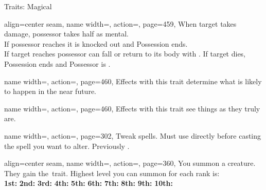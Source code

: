 \begin{PageFrontLandscape}
\begin{TablesHalf}{\frontTableHeight}
\begin{Table}{Traits: Magical}
\begin{entry}{}{%
                align=center seam,
                name width=\conditionLength,%
                action=\Possession,
                page=459,
            }
                When target takes damage, possessor takes half as mental. \hfill
                \\
                If possessor reaches  \HPs it is knocked out and Possession ends.\\
                If target reaches  \HPs possessor can fall \Unconscious or return to its body with .\hfill
                If target dies, Possession ends and Possessor is \Stunned {}.
            \end{entry}
            \begin{entry}{}{%
                name width=\conditionLength,%
                action=\Prediction,
                page=460,
            }
                Effects with this trait determine what is likely to happen in the near future.
            \end{entry}
            \begin{entry}{}{%
                name width=\conditionLength,%
                action=\Revelation,
                page=460,
            }
                Effects with this trait see things as they truly are.
            \end{entry}
            \begin{entry}{}{%
                name width=\conditionLength,%
                action=\Spellshape,
                page=302,
            }
                Tweak spells. Must use directly before casting the spell you want to alter. \hfill
                Previously \Metamagic.
            \end{entry}
            \begin{entry}{}{%
                align=center seam,
                name width=\conditionLength,%
                action=\Summon,
                page=360,
            }
                You summon a creature.
                They gain the \Summoned\,trait.
                Highest level you can summon for each rank is:\\
                \textbf{1st:} 
                \hfill\textbf{2nd:} 
                \hfill\textbf{3rd:} 
                \hfill\textbf{4th:} 
                \hfill\textbf{5th:} 
                \hfill\textbf{6th:} 
                \hfill\textbf{7th:} 
                \hfill\textbf{8th:} 
                \hfill\textbf{9th:} 
                \hfill\textbf{10th:} 
            \end{entry}

\end{Table}
\end{TablesHalf}
\end{PageFrontLandscape}
